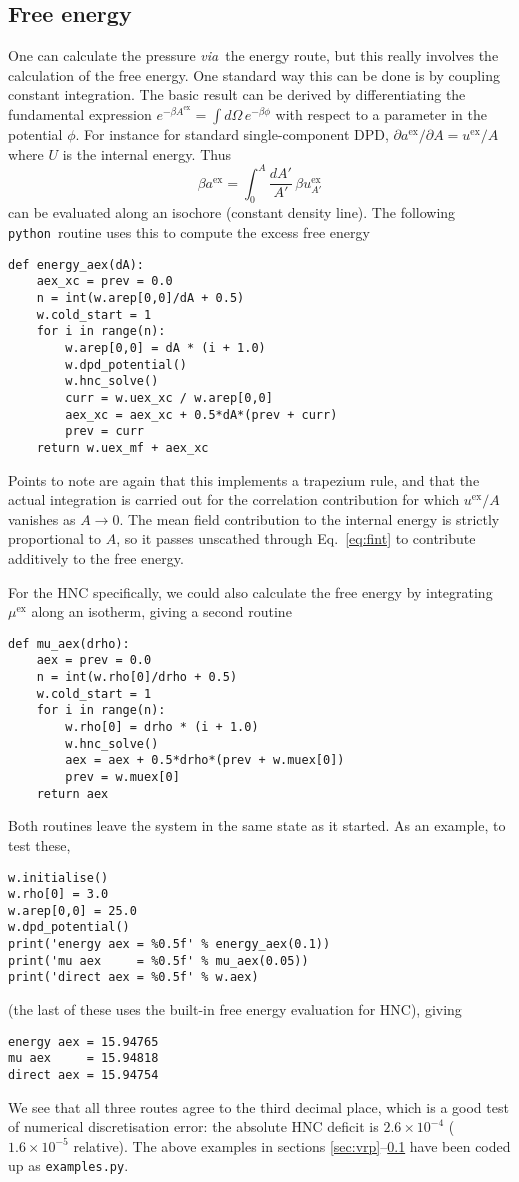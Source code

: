 \documentclass[12pt,a4paper]{article}
\newcommand{\latin}[1]{\emph{#1}}
\newcommand{\via}{\latin{via}}
\newcommand{\myex}{^{\mathrm{ex}}}
\newcommand{\uex}{u\myex}
\newcommand{\Aex}{A\myex}
\newcommand{\aex}{a\myex}
\newcommand{\muex}{\mu\myex}
\newcommand{\Eqref}[1]{Eq.~\eqref{#1}}
\newcommand{\python}{{\tt python}}
\begin{document}
\subsection{Free energy}
\label{sec:feng}
%
One can calculate the pressure \via\ the energy route, but this really
involves the calculation of the free energy.  One standard way this
can be done is by coupling constant integration.  The basic result can
be derived by differentiating the fundamental expression
$e^{-\beta\Aex} = \int\!d\Omega\,e^{-\beta \phi}$ with respect to a
parameter in the potential $\phi$.  For instance for standard
single-component DPD, ${\partial\aex}/{\partial A}={\uex}/{A}$ where $U$
is the internal energy.  Thus
%
\begin{equation}
{\beta \aex}=\int_0^A\frac{dA'}{A'}\,\beta\uex_{A'}
\label{eq:fint}
\end{equation}
%
can be evaluated along an isochore (constant density line).
The following \python\ routine uses this to compute the excess free
energy
%
\begin{verbatim}
def energy_aex(dA):
    aex_xc = prev = 0.0
    n = int(w.arep[0,0]/dA + 0.5)
    w.cold_start = 1
    for i in range(n):
        w.arep[0,0] = dA * (i + 1.0)
        w.dpd_potential()
        w.hnc_solve()
        curr = w.uex_xc / w.arep[0,0]
        aex_xc = aex_xc + 0.5*dA*(prev + curr)
        prev = curr
    return w.uex_mf + aex_xc
\end{verbatim}
%
Points to note are again that this implements a trapezium rule, and
that the actual integration is carried out for the correlation
contribution for which $\uex/A$ vanishes as $A\to0$.  The mean field
contribution to the internal energy is strictly proportional to $A$,
so it passes unscathed through \Eqref{eq:fint} to contribute additively
to the free energy.

For the HNC specifically, we could also calculate the free energy by
integrating $\muex$ along an isotherm, giving a second routine
%
\begin{verbatim}
def mu_aex(drho):
    aex = prev = 0.0
    n = int(w.rho[0]/drho + 0.5)
    w.cold_start = 1
    for i in range(n):
        w.rho[0] = drho * (i + 1.0)
        w.hnc_solve()
        aex = aex + 0.5*drho*(prev + w.muex[0])
        prev = w.muex[0]
    return aex
\end{verbatim}
%
Both routines leave the system in the same state as it started.  As an
example, to test these,
%
\begin{verbatim}
w.initialise()
w.rho[0] = 3.0
w.arep[0,0] = 25.0
w.dpd_potential()
print('energy aex = %0.5f' % energy_aex(0.1))
print('mu aex     = %0.5f' % mu_aex(0.05))
print('direct aex = %0.5f' % w.aex)
\end{verbatim}
%
(the last of these uses the built-in free energy evaluation for HNC), giving
%
\begin{verbatim}
energy aex = 15.94765
mu aex     = 15.94818
direct aex = 15.94754
\end{verbatim}
%
We see that all three routes agree to the third decimal place, which
is a good test of numerical discretisation error: the absolute HNC
deficit is $2.6\times10^{-4}$ ($1.6\times10^{-5}$ relative).  The above
examples in sections \ref{sec:vrp}--\ref{sec:feng} have been coded up
as \verb+examples.py+.
\end{document}
